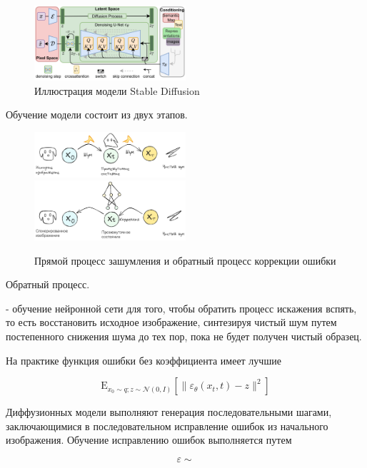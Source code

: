 \begin{figure}[h]
    \centering
    \includegraphics[width=0.5\textwidth]{assets/ml/generation/stable_diffusion.png}
    \caption{Иллюстрация модели Stable Diffusion \cite{stablediffusion}}
    \label{sd_arch}
\end{figure}

Обучение модели состоит из двух этапов.


\begin{figure}[h]
    \centering
    \includegraphics[width=0.5\textwidth]{assets/ml/generation/diffusion_1.excalidraw.png}
    \includegraphics[width=0.5\textwidth]{assets/ml/generation/diffusion_2.excalidraw.png}
    \caption{Прямой процесс зашумления и обратный процесс коррекции ошибки \cite{stablediffusion}}
    \label{sd_arch}
\end{figure}

Обратный процесс.

- обучение нейронной сети для того,
 чтобы обратить процесс искажения вспять, то есть восстановить исходное изображение,
  синтезируя чистый шум путем постепенного снижения шума до тех пор, пока не будет получен чистый образец.



На практике функция ошибки без коэффициента 
имеет лучшие

\begin{equation}
    \mathrm{E}_{x_0 \sim q; z\sim \mathcal{N}(0,I)} 
    \left[ \| \varepsilon_\theta(x_t,t) -z \|^2\right]
\end{equation}

Диффузионных модели выполняют генерация последовательными шагами, заключающимися 
в последовательном исправление ошибок из начального изображения. Обучение исправлению ошибок выполняется путем 

$$
    \varepsilon \sim 
$$

